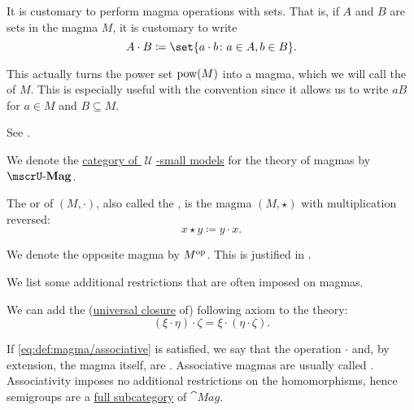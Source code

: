 \begin{definition}
\begin{thmenum}[series=def:magma]
     It is customary to perform magma operations with sets. That is, if \( A \) and \( B \) are sets in the magma \( M \), it is customary to write
    \begin{equation*}
      A \cdot B \coloneqq \set{ a \cdot b \colon a \in A, b \in B }.
    \end{equation*}

    This actually turns the power set \( \operatorname{pow}(M) \) into a magma, which we will call the  of \( M \). This is especially useful with the convention  since it allows us to write \( aB \) for \( a \in M \) and \( B \subseteq M \).

    See .

     We denote the \hyperref[def:category_of_small_first_order_models]{category of \( \mscrU \)-small models} for the theory of magmas by \( \ucat{Mag} \).

     The  or  of \( (M, \cdot) \), also called the , is the magma \( (M, \star) \) with multiplication reversed:
    \begin{equation*}
      x \star y \coloneqq y \cdot x.
    \end{equation*}

    We denote the opposite magma by \( M^{\operatorname{op}} \). This is justified in .
  \end{thmenum}

  We list some additional restrictions that are often imposed on magmas.
  \begin{thmenum}[resume=def:magma]
     We can add the (\hyperref[thm:implicit_universal_quantification]{universal closure} of) following axiom to the theory:
    \begin{equation}\label{eq:def:magma/associative}
      (\xi \cdot \eta) \cdot \zeta = \xi \cdot (\eta \cdot \zeta).
    \end{equation}

    If \eqref{eq:def:magma/associative} is satisfied, we say that the operation \( \cdot \) and, by extension, the magma itself, are . Associative magmas are usually called . Associativity imposes no additional restrictions on the homomorphisms, hence semigroups are a \hyperref[def:subcategory]{full subcategory} of \( \cat{Mag} \).


\end{thmenum}
\end{definition}
